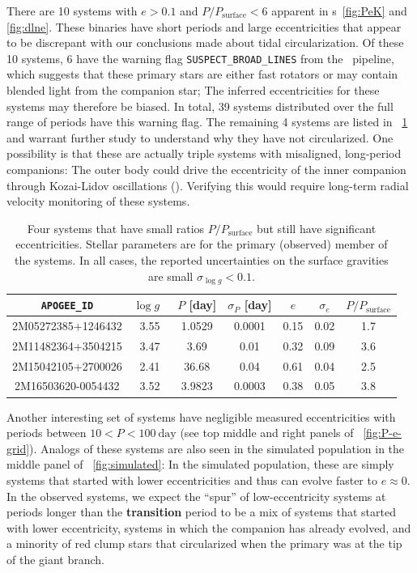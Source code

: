 \documentclass[modern, letterpaper]{aastex62}
\newcommand{\apogee}{\project{\acronym{APOGEE}}}
\newcommand{\logg}{\ensuremath{\log g}}
\newcommand{\Psurf}{\ensuremath{P_\textrm{surface}}}
\renewcommand{\changes}[1]{\textbf{#1}}
\begin{document}
There are 10 systems with $e > 0.1$ and $P/\Psurf < 6$ apparent in \figurename
s~\ref{fig:PeK} and \ref{fig:dlne}.
These binaries have short periods and large eccentricities that appear to be
discrepant with our conclusions made about tidal circularization.
Of these 10 systems, 6 have the warning flag \texttt{SUSPECT\_BROAD\_LINES} from
the \apogee\ pipeline, which suggests that these primary stars are either fast
rotators or may contain blended light from the companion star; The inferred
eccentricities for these systems may therefore be biased.
In total, 39 systems distributed over the full range of periods have this
warning flag.
The remaining 4 systems are listed in \tablename~\ref{tbl:except} and warrant
further study to understand why they have not circularized.
One possibility is that these are actually triple systems with misaligned,
long-period companions: The outer body could drive the eccentricity of the inner
companion through Kozai-Lidov oscillations (\citealt{Kozai:1962, Lidov:1962}).
Verifying this would require long-term radial velocity monitoring of these
systems.

\begin{table}[h]
    \centering
    \begin{tabular}{ c c c c c c c }
    \hline
    \texttt{APOGEE\_ID} & \logg\ & $P$ [day] & $\sigma_P$ [day] & $e$ & $\sigma_e$ & $P/\Psurf$ \\
    \hline
    2M05272385+1246432 & 3.55 & 1.0529 & 0.0001 & 0.15 & 0.02 & 1.7\\
    2M11482364+3504215 & 3.47 & 3.69   & 0.01   & 0.32 & 0.09 & 3.6\\
    2M15042105+2700026 & 2.41 & 36.68  & 0.04   & 0.61 & 0.04 & 2.5\\
    2M16503620-0054432 & 3.52 & 3.9823 & 0.0003 & 0.38 & 0.05 & 3.8\\
    \hline
    \end{tabular}
    \caption{Four systems that have small ratios $P/\Psurf$ but still have
    significant eccentricities.
    Stellar parameters are for the primary (observed) member of the systems.
    In all cases, the reported uncertainties on the surface gravities are small
    $\sigma_{\logg} < 0.1$.
    }
    \label{tbl:except}
\end{table}

Another interesting set of systems have negligible measured eccentricities with
periods between $10 < P < 100~\textrm{day}$ (see top middle and right panels of
\figurename~\ref{fig:P-e-grid}).
Analogs of these systems are also seen in the simulated population in the middle
panel of \figurename~\ref{fig:simulated}: In the simulated population, these are
simply systems that started with lower eccentricities and thus can evolve faster
to $e \approx 0$.
In the observed systems, we expect the ``spur'' of low-eccentricity systems at
periods longer than the \changes{transition} period to be a mix of systems that
started with lower eccentricity, systems in which the companion has already
evolved, and a minority of red clump stars that circularized when the primary
was at the tip of the giant branch.
\end{document}
